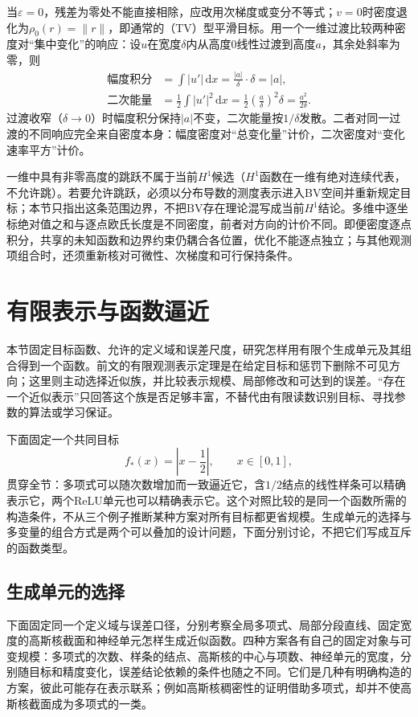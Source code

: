 当$\varepsilon=0$，残差为零处不能直接相除，应改用次梯度或变分不等式；$v=0$时密度退化为$\rho_0(r)=\|r\|$，即通常的（TV）型平滑目标。用一个一维过渡比较两种密度对“集中变化”的响应：设$u$在宽度$\delta$内从高度$0$线性过渡到高度$a$，其余处斜率为零，则
\[
  \begin{aligned}
    \text{幅度积分}&=\int|u'|\,\mathrm dx=\frac{|a|}{\delta}\cdot\delta=|a|,\\
    \text{二次能量}&=\frac12\int|u'|^2\,\mathrm dx
      =\frac12\left(\frac a\delta\right)^2\delta=\frac{a^2}{2\delta}.
  \end{aligned}
\]
过渡收窄（$\delta\to0$）时幅度积分保持$|a|$不变，二次能量按$1/\delta$发散。二者对同一过渡的不同响应完全来自密度本身：幅度密度对“总变化量”计价，二次密度对“变化速率平方”计价。

一维中具有非零高度的跳跃不属于当前$H^1$候选（$H^1$函数在一维有绝对连续代表，不允许跳）。若要允许跳跃，必须以分布导数的测度表示进入BV空间并重新规定目标；本节只指出这条范围边界，不把BV存在理论混写成当前$H^1$结论。多维中逐坐标绝对值之和与逐点欧氏长度是不同密度，前者对方向的计价不同。即便密度逐点积分，共享的未知函数和边界约束仍耦合各位置，优化不能逐点独立；与其他观测项组合时，还须重新核对可微性、次梯度和可行保持条件。
\section{有限表示与函数逼近}
\label{sec:finite-representation-approximation}

本节固定目标函数、允许的定义域和误差尺度，研究怎样用有限个生成单元及其组合得到一个函数。前文的有限观测表示定理是在给定目标和惩罚下删除不可见方向；这里则主动选择近似族，并比较表示规模、局部修改和可达到的误差。“存在一个近似表示”只回答这个族是否足够丰富，不替代由有限读数识别目标、寻找参数的算法或学习保证。

下面固定一个共同目标
\[
  f_*(x)=\left|x-\frac12\right|,\qquad x\in[0,1],
\]
贯穿全节：多项式可以随次数增加而一致逼近它，含$1/2$结点的线性样条可以精确表示它，两个ReLU单元也可以精确表示它。这个对照比较的是同一个函数所需的构造条件，不从三个例子推断某种方案对所有目标都更省规模。生成单元的选择与多变量的组合方式是两个可以叠加的设计问题，下面分别讨论，不把它们写成互斥的函数类型。

\subsection{生成单元的选择}
\label{subsubsec:choice-of-generating-units}

下面固定同一个定义域与误差口径，分别考察全局多项式、局部分段直线、固定宽度的高斯核截面和神经单元怎样生成近似函数。四种方案各有自己的固定对象与可变规模：多项式的次数、样条的结点、高斯核的中心与项数、神经单元的宽度，分别随目标和精度变化，误差结论依赖的条件也随之不同。它们是几种有明确构造的方案，彼此可能存在表示联系；例如高斯核稠密性的证明借助多项式，却并不使高斯核截面成为多项式的一类。

